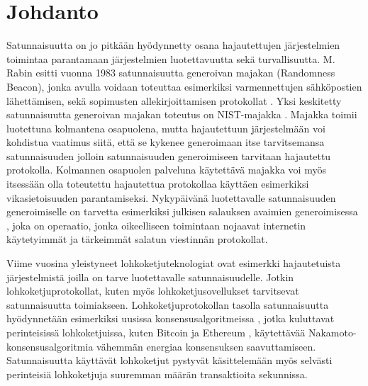 \chapter{Johdanto\label{intro}}

Satunnaisuutta on jo pitkään hyödynnetty osana hajautettujen järjestelmien toimintaa parantamaan järjestelmien luotettavuutta sekä turvallisuutta. M. Rabin esitti vuonna 1983 satunnaisuutta generoivan majakan (Randomness Beacon), jonka avulla voidaan toteuttaa esimerkiksi varmennettujen sähköpostien lähettämisen, sekä sopimusten allekirjoittamisen protokollat \cite{rabin_transaction_1983}. Yksi keskitetty satunnaisuutta generoivan majakan toteutus on NIST-majakka \cite{computer_security_division_interoperable_2019}. Majakka toimii luotettuna kolmantena osapuolena, mutta hajautettuun järjestelmään voi kohdistua vaatimus siitä, että se kykenee generoimaan itse tarvitsemansa satunnaisuuden jolloin satunnaisuuden generoimiseen tarvitaan hajautettu protokolla. Kolmannen osapuolen palveluna käytettävä majakka voi myös itsessään olla toteutettu hajautettua protokollaa käyttäen esimerkiksi vikasietoisuuden parantamiseksi. Nykypäivänä luotettavalle satunnaisuuden generoimiselle on tarvetta esimerkiksi julkisen salauksen avaimien generoimisessa \cite{corrigan-gibbs_ensuring_2014}, joka on operaatio, jonka oikeelliseen toimintaan nojaavat internetin käytetyimmät ja tärkeimmät salatun viestinnän protokollat. 

Viime vuosina yleistyneet lohkoketjuteknologiat ovat esimerkki hajautetuista järjestelmistä joilla on tarve luotettavalle satunnaisuudelle. Jotkin lohkoketjuprotokollat, kuten myös lohkoketjusovellukset tarvitsevat satunnaisuutta toimiakseen. Lohkoketjuprotokollan tasolla satunnaisuutta hyödynnetään esimerkiksi uusissa konsensusalgoritmeissa \cite{gilad_algorand_2017, hanke_dfinity_2018}, jotka kuluttavat perinteisissä lohkoketjuissa, kuten Bitcoin \cite{noauthor_bitcoin_nodate} ja Ethereum \cite{noauthor_ethereum_nodate}, käytettävää Nakamoto-konsensusalgoritmia vähemmän energiaa konsensuksen saavuttamiseen. Satunnaisuutta käyttävät lohkoketjut pystyvät käsittelemään myös selvästi perinteisiä lohkoketjuja suuremman määrän transaktioita sekunnissa.

